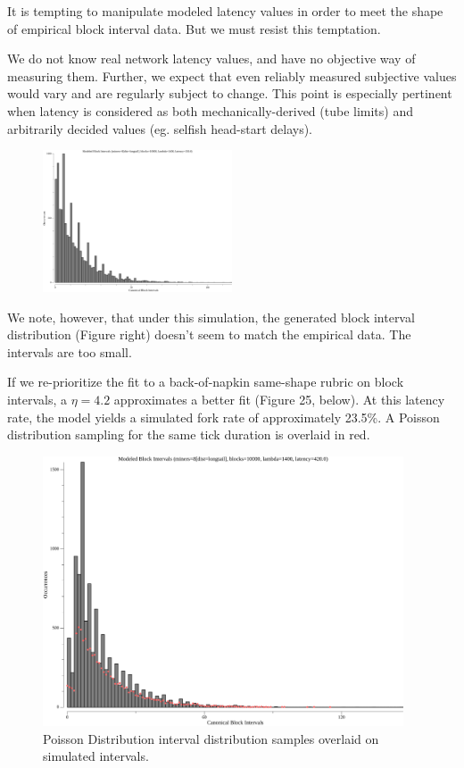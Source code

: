 \documentclass[11pt]{article}
\theoremstyle{plain}
\begin{document}
It is tempting to manipulate modeled latency values in order to meet the
shape of empirical block interval data. But we must resist this temptation.

We do not know real network latency values, and have no objective way of
measuring them. Further, we expect that even reliably measured subjective values
would vary and are regularly subject to change. This point is especially
pertinent when latency is considered as both mechanically-derived (tube limits) and
arbitrarily decided values (eg. selfish head-start delays).

\begin{figure}
    \centering
    \includegraphics[width=0.5\textwidth]{sim_a_anteater.png}
\end{figure}

We note, however, that under this simulation, the generated block interval
distribution (Figure right) doesn't seem to match the empirical data.
The intervals are too small.

If we re-prioritize the fit to a back-of-napkin same-shape rubric on block
intervals, a $\eta=4.2$ approximates a better fit (Figure 25, below). At this
latency rate, the model yields a simulated fork rate of approximately 23.5\%.
A Poisson distribution sampling for the same tick duration is overlaid in red.

\begin{figure}[tph]
    \centering
    \includegraphics[height=8cm]{sim_a_bravo.png}
    \caption{
      Poisson Distribution interval distribution samples
      overlaid on simulated intervals.
    }
    \label{fig:sim_a_bravo}
\end{figure}
\end{document}
